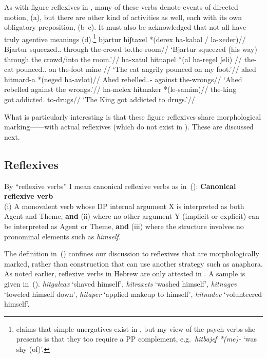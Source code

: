 As with figure reflexives in {\tnif}, many of these verbs denote events of directed motion, (\nextx a), but there are other kind of activities as well, each with its own obligatory preposition, (\nextx b--c). It must also be acknowledged that not all have truly agentive meanings (\nextx d).\footnote{\cite{siloni08} claims that simple unergatives exist in {\thit}, but my view of the psych-verbs she presents is that they too require a PP complement, e.g.~\emph{hitbajeʃ *(me)-} `was shy (of)'.}
\pex
	\a \begingl
		\gla bjartur hiʃtaxel *(derex ha-kahal / la-xeder)//
		\glb Bjartur squeezed.. through the-crowd {} to.the-room//
		\glft `Bjartur squeezed (his way) through the crowd/into the room.'//
		\endgl
	\a \begingl
		\gla ha-xatul hitnapel *(al ha-regel ʃeli) //
		\glb the-cat pounced.. on the-foot mine //
		\glft `The cat angrily pounced on my foot.'//
		\endgl
	\a \begingl
		\gla ahed hitmard-a *(neged ha-avlot)//
		\glb Ahed rebelled..- against the-wrongs//
		\glft `Ahed rebelled against the wrongs.'//
		\endgl
	\a \begingl
		\gla ha-melex hitmaker *(le-samim)//
		\glb the-king got.addicted. to-drugs//
		\glft `The King got addicted to drugs.'//
		\endgl
\xe

What is particularly interesting is that these figure reflexives share morphological marking---\thit---with actual reflexives (which do not exist in {\tnif}). These are discussed next.

	\subsection{Reflexives} \label{vz:thit:refl}
By ``reflexive verbs'' I mean canonical reflexive verbs as in~(\nextx):
\ex \textbf{Canonical reflexive verb}\\
	(i) A monovalent verb whose DP internal argument X is interpreted as both Agent and Theme, \textbf{and} (ii) where no other argument Y (implicit or explicit) can be interpreted as Agent or Theme, \textbf{and} (iii) where the structure involves no pronominal elements such as \emph{himself}.
\xe

The definition in~(\lastx) confines our discussion to reflexives that are morphologically marked, rather than construction that can use another strategy such as anaphora. As noted earlier, reflexive verbs in Hebrew are only attested in \thit. A sample is given in~(\nextx).
\ex\label{ex:refl}\emph{hitgaleax} `shaved himself', \emph{hitraxets} `washed himself', \emph{hitnagev} `toweled himself down', \emph{hitaper} `applied makeup to himself', \emph{hitnadev} `volunteered himself'.
\xe


